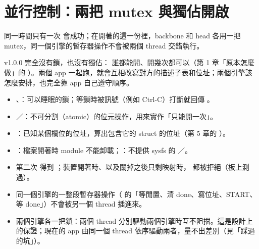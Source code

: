 \section{並行控制：兩把 mutex 與獨佔開啟}
\label{sec:lock}

\begin{oneline}
同一時間只有一次  會成功；在開著的這一份裡，backbone 和 head 各用一把 mutex，同一個引擎的暫存器操作不會被兩個 thread 交錯執行。
\end{oneline}

\begin{before}
v1.0.0 完全沒有鎖，也沒有獨佔： 誰都能開、開幾次都可以（第 1 章「原本怎麼做」的 ）。兩個 app 一起跑，就會互相改寫對方的描述子表和位址；兩個引擎該怎麼安排，也完全靠 app 自己遵守順序。
\end{before}

\begin{tech}
\begin{itemize}
\item {}、：可以睡眠的鎖；等鎖時被訊號（例如 Ctrl-C）打斷就回傳 。
\item {}／：不可分割（atomic）的位元操作，用來實作「只能開一次」。
\item {}：已知某個欄位的位址，算出包含它的 struct 的位址（第 5 章的 ）。
\item {}：檔案開著時 module 不能卸載；：不提供 sysfs 的 ／。
\end{itemize}
\end{tech}

\begin{gain}
\begin{itemize}
\item 第二次  得到 ；裝置開著時、以及關掉之後只剩映射時， 都被拒絕（板上測過）。
\item 同一個引擎的一整段暫存器操作（ 的「等閒置、清 done、寫位址、START、等 done」）不會被另一個 thread 插進來。
\item 兩個引擎各一把鎖：兩個 thread 分別驅動兩個引擎時互不阻擋。這是設計上的保證；現在的 app 由同一個 thread 依序驅動兩者，量不出差別（見「踩過的坑」）。
\end{itemize}
\end{gain}

